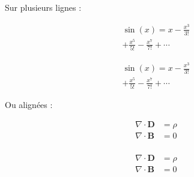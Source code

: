 \documentclass{article}
\begin{document}
\begin{multicols*}{3}
Sur plusieurs lignes :\par
\begin{minipage}[c]{0.3\linewidth}
    \begin{multline*}
        \sin(x)=x-\frac{x^3}{3!} \\
        +\frac{x^5}{5!}-\frac{x^7}{7!}+\cdots
    \end{multline*}
\end{minipage}
\begin{minipage}[c]{0.7\linewidth}
    \begin{latexcode}
        \begin{multline*}
            \sin(x)=x-\frac{x^3}{3!} \\
            +\frac{x^5}{5!}-\frac{x^7}{7!}+\cdots
        \end{multline*}
    \end{latexcode}
\end{minipage}

Ou alignées :\par
\begin{minipage}[c]{0.3\linewidth}
    \begin{align*}
        \nabla\cdot\boldsymbol{D} & = \rho \\
        \nabla\cdot\boldsymbol{B} & = 0    \\
    \end{align*}
\end{minipage}
\begin{minipage}[c]{0.7\linewidth}
    \begin{latexcode}
        \begin{align*}
            \nabla\cdot\boldsymbol{D} & = \rho \\
            \nabla\cdot\boldsymbol{B} & = 0    \\
        \end{align*}
    \end{latexcode}
\end{minipage}


\end{multicols*}
\end{document}
